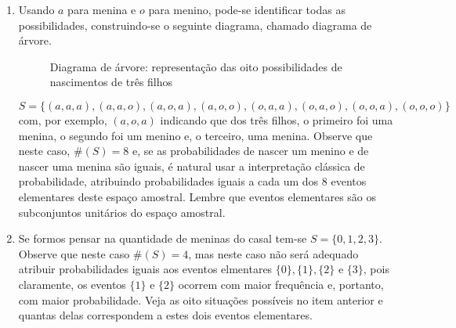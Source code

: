 \documentclass[10 pt,usenames,dvipsnames, oneside]{article}
\begin{document}
\ifdefined\prof
\begin{solucao}

\begin{enumerate}
\item Usando $a$ para menina e $o$ para menino, pode-se identificar todas as possibilidades, construindo-se o seguinte diagrama, chamado diagrama de árvore.

\begin{figure}[H]
\centering
{}
\caption{Diagrama de árvore: representação das oito possibilidades de nascimentos de três filhos}
\end{figure}

{\small$S=\{(a,a,a), (a,a,o), (a,o,a), (a,o,o), (o,a,a), (o,a,o), (o,o,a), (o,o,o)\}$} com, por exemplo, $(a,o,a)$ indicando que dos três filhos, o primeiro foi uma menina, o segundo foi um menino e, o terceiro, uma menina. Observe que neste caso, $\#(S)=8$ e, se as probabilidades de nascer um menino e de nascer uma menina são iguais, é natural usar a interpretação clássica de probabilidade, atribuindo probabilidades iguais a cada um dos 8 eventos elementares deste espaço amostral. Lembre que eventos elementares são os subconjuntos unitários do espaço amostral.

\item Se formos pensar na quantidade de meninas do casal tem-se $S=\{0,1,2,3\}$. Observe que neste caso $\#(S)=4$, mas neste caso não será adequado atribuir probabilidades iguais aos eventos elmentares $\{0\}, \{1\}, \{2\}$ e $\{3\}$, pois claramente, os eventos $\{1\}$ e $\{2\}$ ocorrem com maior frequência e, portanto, com maior probabilidade. Veja as oito situações possíveis no item anterior e quantas delas correspondem a estes dois eventos elementares.
\end{enumerate}

\end{solucao}
\fi
\end{document}
